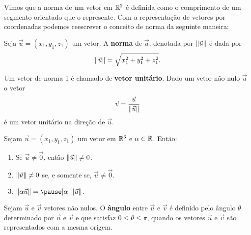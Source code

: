 \documentclass{beamer}
\begin{document}
\begin{frame}
    Vimos que a norma de um vetor em $\mathbb{R}^2$ \pause é definida como o comprimento de um segmento orientado que o represente. \pause Com a representação de vetores por coordenadas podemos reescrever o conceito de norma da seguinte maneira:\pause
    \begin{definicao}
        Seja $\vec{u} = (x_1, y_1,z_1)$ \pause um vetor. A \textbf{norma} \pause de $\vec{u}$, \pause denotada por $\left\Vert{\vec{u}}\right\Vert$ \pause é dada por\pause
        \[
            \left\Vert{\vec{u}}\right\Vert = \sqrt{x_1^2 + y_1^2 + z_1^2}.
        \]
    \end{definicao}
\end{frame}

\begin{frame}
    Um vetor de norma 1 \pause é chamado de \textbf{vetor unitário}. \pause Dado um vetor não nulo $\vec{u}$ \pause o vetor\pause
    \[
        \vec{v} = \dfrac{\vec{u}}{\left\Vert{\vec{u}}\right\Vert}
    \]\pause
    é um vetor unitário \pause na direção de $\vec{u}$.
\end{frame}

\begin{frame}
    \begin{proposicao}
        Sejam $\vec{u} = (x_1, y_1,z_1)$ \pause um vetor em $\mathbb{R}^3$ \pause e $\alpha \in \mathbb{R}$. \pause Então:\pause
        \begin{enumerate}[label=({\arabic*})]
            \item Se $\vec{u} \ne \vec{0}$, \pause então $\left\Vert{\vec{u}}\right\Vert \ne 0$.\pause
            \item $\left\Vert{\vec{u}}\right\Vert \ne 0$ \pause se, e somente se, \pause $\vec{u} \ne \vec{0}$.\pause
            \item $\norm{\alpha\vec{u}} = \pause |\alpha|\norm{\vec{u}}$.
        \end{enumerate}
    \end{proposicao}
\end{frame}

\begin{frame}
    \begin{definicao}
        Sejam $\vec{u}$ \pause e $\vec{v}$ \pause vetores não nulos. \pause O \textbf{ângulo} \pause entre $\vec{u}$ e $\vec{v}$ \pause é definido pelo ângulo $\theta$ \pause determinado por $\vec{u}$ e $\vec{v}$ \pause e que satisfaz $0 \le \theta \le \pi$, \pause quando os vetores $\vec{u}$ e $\vec{v}$ \pause são representados com a mesma origem.
    \end{definicao}
\end{frame}
\end{document}
